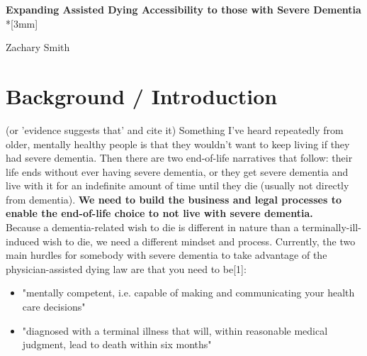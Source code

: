 \documentclass{proposalnsf}
\begin{document}
\begin{center}
    \begin{spacing}{1.75}
      {\Large{\bf Expanding Assisted Dying Accessibility to those with Severe Dementia}}\\*[3mm]
    \end{spacing}

Zachary Smith 

\end{center}

\tableofcontents


\noindent

\noindent


\renewcommand{\thepage} {B--\arabic{page}}

\newpage


\renewcommand{\thepage} {D--\arabic{page}}

\newpage

%
%



\section{Background / Introduction}
(or 'evidence suggests that' and cite it) Something I've heard repeatedly from older, mentally healthy people is that they wouldn't want to keep living if they had severe dementia. Then there are two end-of-life narratives that follow: their life ends without ever having severe dementia, or they get severe dementia and live with it for an indefinite amount of time until they die (usually not directly from dementia). \textbf{We need to build the business and legal processes to enable the end-of-life choice to not live with severe dementia.}
\\

Because a dementia-related wish to die is different in nature than a terminally-ill-induced wish to die, we need a different mindset and process.
Currently, the two main hurdles for somebody with severe dementia to take advantage of the physician-assisted dying law are that you need to be[1]:
\begin{itemize}
    \item{"mentally competent, i.e. capable of making and communicating your health care decisions"}
    \item{"diagnosed with a terminal illness that will, within reasonable medical judgment, lead to death within six months"}
\end{itemize}
\end{document}
